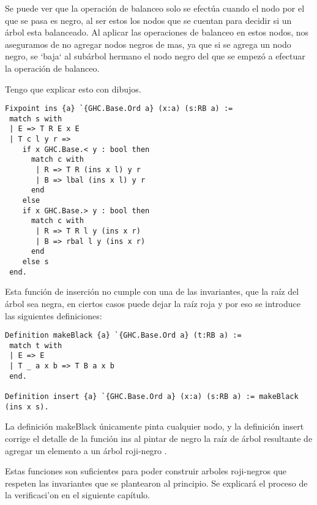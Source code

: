 \documentclass[letterpaper,12pt,oneside]{book}
\newcommand{\arn}{árbol roji-negro }
\newcommand{\arns}{arboles roji-negros }
\theoremstyle{plain}
\theoremstyle{definition}
\theoremstyle{remark}
\begin{document}
Se puede ver que la operación de balanceo solo se efectúa cuando el nodo por el que se pasa es negro, al ser estos los nodos que se cuentan para decidir si un \'arbol
esta balanceado. Al aplicar las operaciones de balanceo en estos nodos, nos aseguramos de no agregar nodos negros de mas, ya que si se agrega un nodo negro, se `baja` al subárbol hermano
el nodo negro del que se empez\'o a efectuar la operación de balanceo. 

Tengo que explicar esto con dibujos.
\begin{verbatim}
Fixpoint ins {a} `{GHC.Base.Ord a} (x:a) (s:RB a) :=
 match s with
 | E => T R E x E
 | T c l y r =>
    if x GHC.Base.< y : bool then 
      match c with
       | R => T R (ins x l) y r
       | B => lbal (ins x l) y r
      end
    else 
    if x GHC.Base.> y : bool then 
      match c with
       | R => T R l y (ins x r)
       | B => rbal l y (ins x r)
      end
    else s
 end.
\end{verbatim}

Esta función de inserción no cumple con una de las invariantes, que la raíz del árbol sea negra, en ciertos casos puede dejar la raíz roja y por eso se introduce las siguientes definiciones:

\begin{verbatim}
Definition makeBlack {a} `{GHC.Base.Ord a} (t:RB a) :=
 match t with
 | E => E
 | T _ a x b => T B a x b
 end.

Definition insert {a} `{GHC.Base.Ord a} (x:a) (s:RB a) := makeBlack (ins x s).
\end{verbatim}

La definici\'on makeBlack únicamente pinta cualquier nodo, y la definición insert corrige el detalle de la función ins al pintar de negro la raíz de árbol resultante de 
agregar un elemento a un \arn.

Estas funciones son suficientes para poder construir \arns que respeten las invariantes que se plantearon al principio. Se explicar\'a el proceso de la verificaci'on en el siguiente cap\'itulo.
\end{document}
